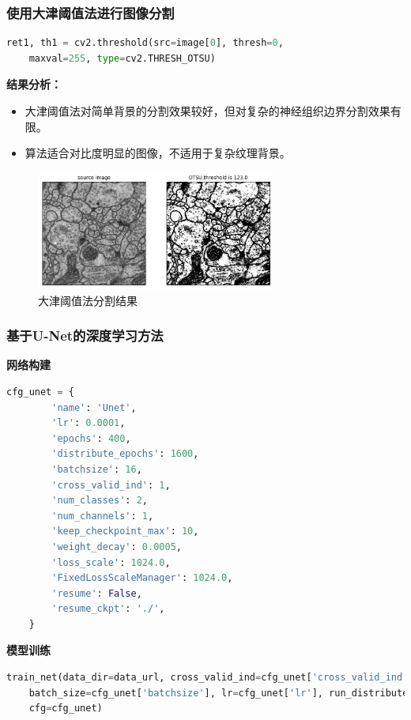 \documentclass[12pt]{ctexart}
\begin{document}
\subsubsection*{使用大津阈值法进行图像分割}

\begin{lstlisting}[language=Python]
    ret1, th1 = cv2.threshold(src=image[0], thresh=0, 
    maxval=255, type=cv2.THRESH_OTSU)
\end{lstlisting}


\textbf{结果分析：}
\begin{itemize}
    \item 大津阈值法对简单背景的分割效果较好，但对复杂的神经组织边界分割效果有限。
    \item 算法适合对比度明显的图像，不适用于复杂纹理背景。
\end{itemize}

\begin{figure}[H]
    \centering
    \includegraphics[width=0.7\textwidth]{image/1.png}
    \caption{大津阈值法分割结果}
\end{figure}


\subsubsection*{基于U-Net的深度学习方法}
\textbf{网络构建}
\newpage
\begin{lstlisting}[language=Python,caption={网络参数}]
    cfg_unet = {
        'name': 'Unet',
        'lr': 0.0001,
        'epochs': 400,
        'distribute_epochs': 1600,
        'batchsize': 16,
        'cross_valid_ind': 1,
        'num_classes': 2,
        'num_channels': 1,
        'keep_checkpoint_max': 10,
        'weight_decay': 0.0005,
        'loss_scale': 1024.0,
        'FixedLossScaleManager': 1024.0,
        'resume': False,
        'resume_ckpt': './',
    }
\end{lstlisting}

\textbf{模型训练}
\begin{lstlisting}[language=Python]
    train_net(data_dir=data_url, cross_valid_ind=cfg_unet['cross_valid_ind'], epochs=epoch_size,
    batch_size=cfg_unet['batchsize'], lr=cfg_unet['lr'], run_distribute=run_distribute,
    cfg=cfg_unet)
\end{lstlisting}
\end{document}

